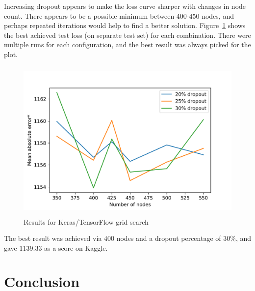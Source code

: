 \documentclass[a4paper]{article}
\begin{document}
Increasing dropout appears to make the loss curve sharper with changes in node count.  There appears to be a possible minimum between 400-450 nodes, and perhaps repeated iterations would help to find a better solution.  Figure~\ref{fig:keras-search} shows the best achieved test loss (on separate test set) for each combination.  There were multiple runs for each configuration, and the best result was always picked for the plot.

\begin{figure}[H]
	\centering
	\includegraphics[width=15cm,height=8cm,keepaspectratio]{Images/keras-search.png}
	\caption{Results for Keras/TensorFlow grid search}
	\label{fig:keras-search}
\end{figure}

The best result was achieved via 400 nodes and a dropout percentage of 30\%, and gave 1139.33 as a score on Kaggle.





\section{Conclusion}
\end{document}
